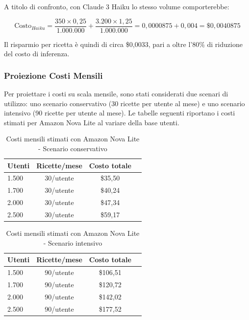 A titolo di confronto, con Claude 3 Haiku lo stesso volume comporterebbe:

\begin{equation}
\text{Costo}_{Haiku} = \frac{350 \times 0,25}{1.000.000} + \frac{3.200 \times 1,25}{1.000.000} = 0,0000875 + 0,004 = \$0,0040875
\end{equation}

Il risparmio per ricetta è quindi di circa \$0,0033, pari a oltre l'80\% di riduzione del costo di inferenza.

\subsubsection{Proiezione Costi Mensili}

Per proiettare i costi su scala mensile, sono stati considerati due scenari di utilizzo: uno scenario conservativo (30 ricette per utente al mese) e uno scenario intensivo (90 ricette per utente al mese). Le tabelle seguenti riportano i costi stimati per Amazon Nova Lite al variare della base utenti.

\begin{table}[H]
\centering
\begin{tabular}{|l|c|c|c|}
\hline
\textbf{Utenti} & \textbf{Ricette/mese} & \textbf{Costo totale} \\
\hline
1.500 & 30/utente & \$35,50 \\
\hline
1.700 & 30/utente & \$40,24 \\
\hline
2.000 & 30/utente & \$47,34 \\
\hline
2.500 & 30/utente & \$59,17 \\
\hline
\end{tabular}
\caption{Costi mensili stimati con Amazon Nova Lite - Scenario conservativo}
\label{tab:costi-conservativo}
\end{table}

\begin{table}[H]
\centering
\begin{tabular}{|l|c|c|c|}
\hline
\textbf{Utenti} & \textbf{Ricette/mese} & \textbf{Costo totale} \\
\hline
1.500 & 90/utente & \$106,51 \\
\hline
1.700 & 90/utente & \$120,72 \\
\hline
2.000 & 90/utente & \$142,02 \\
\hline
2.500 & 90/utente & \$177,52 \\
\hline
\end{tabular}
\caption{Costi mensili stimati con Amazon Nova Lite - Scenario intensivo}
\label{tab:costi-intensivo}
\end{table}


